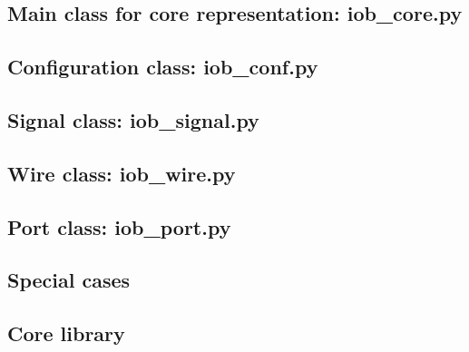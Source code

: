 \documentclass{ug}
\begin{document}
\subsection{Main class for core representation: iob\_core.py}
\label{sec:iob_core}


\subsection{Configuration class: iob\_conf.py}
\label{sec:iob_conf}


\subsection{Signal class: iob\_signal.py}
\label{sec:iob_signal}


\subsection{Wire class: iob\_wire.py}
\label{sec:iob_wire}


\subsection{Port class: iob\_port.py}
\label{sec:iob_port}


\subsection{Special cases}
\label{sec:special_cases}


\subsection{Core library}
\label{sec:core_lib}


%
%
% 
% 
% 
% 
% 
% 
% 
% 
\end{document}
